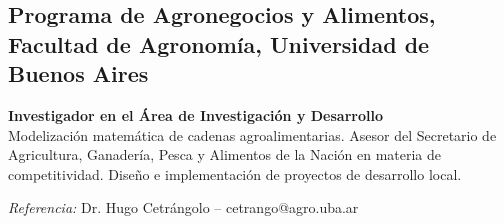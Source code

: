 \subsection{Programa de Agronegocios y Alimentos, Facultad de Agronomía, Universidad de Buenos Aires}

\begin{timeline}
 \textbf{Investigador en el Área de Investigación y Desarrollo} \\
Modelización matemática de cadenas agroalimentarias. Asesor del Secretario de Agricultura, Ganadería, Pesca y Alimentos de la Nación en materia de competitividad. Diseño e implementación de proyectos de desarrollo local.

\textit{Referencia:} Dr. Hugo Cetrángolo -- cetrango@agro.uba.ar
\end{timeline}